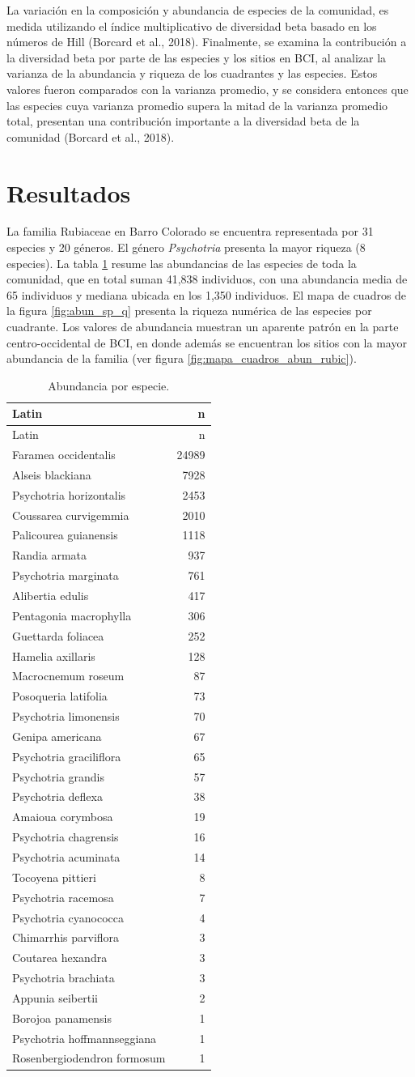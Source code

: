 \documentclass[11pt,]{article}
\begin{document}
La variación en la composición y abundancia de especies de la comunidad,
es medida utilizando el índice multiplicativo de diversidad beta basado
en los números de Hill (Borcard et al., 2018). Finalmente, se examina la
contribución a la diversidad beta por parte de las especies y los sitios
en BCI, al analizar la varianza de la abundancia y riqueza de los
cuadrantes y las especies. Estos valores fueron comparados con la
varianza promedio, y se considera entonces que las especies cuya
varianza promedio supera la mitad de la varianza promedio total,
presentan una contribución importante a la diversidad beta de la
comunidad (Borcard et al., 2018).

\section{Resultados}\label{resultados}

La familia Rubiaceae en Barro Colorado se encuentra representada por 31
especies y 20 géneros. El género \emph{Psychotria} presenta la mayor
riqueza (8 especies). La tabla \ref{tab:abun_sp} resume las abundancias
de las especies de toda la comunidad, que en total suman 41,838
individuos, con una abundancia media de 65 individuos y mediana ubicada
en los 1,350 individuos. El mapa de cuadros de la figura
\ref{fig:abun_sp_q} presenta la riqueza numérica de las especies por
cuadrante. Los valores de abundancia muestran un aparente patrón en la
parte centro-occidental de BCI, en donde además se encuentran los sitios
con la mayor abundancia de la familia (ver figura
\ref{fig:mapa_cuadros_abun_rubic}).

\begin{longtable}[]{@{}lr@{}}
\caption{\label{tab:abun_sp}Abundancia por especie.}\tabularnewline
\toprule
Latin & n\tabularnewline
\midrule
\endfirsthead
\toprule
Latin & n\tabularnewline
\midrule
\endhead
Faramea occidentalis & 24989\tabularnewline
Alseis blackiana & 7928\tabularnewline
Psychotria horizontalis & 2453\tabularnewline
Coussarea curvigemmia & 2010\tabularnewline
Palicourea guianensis & 1118\tabularnewline
Randia armata & 937\tabularnewline
Psychotria marginata & 761\tabularnewline
Alibertia edulis & 417\tabularnewline
Pentagonia macrophylla & 306\tabularnewline
Guettarda foliacea & 252\tabularnewline
Hamelia axillaris & 128\tabularnewline
Macrocnemum roseum & 87\tabularnewline
Posoqueria latifolia & 73\tabularnewline
Psychotria limonensis & 70\tabularnewline
Genipa americana & 67\tabularnewline
Psychotria graciliflora & 65\tabularnewline
Psychotria grandis & 57\tabularnewline
Psychotria deflexa & 38\tabularnewline
Amaioua corymbosa & 19\tabularnewline
Psychotria chagrensis & 16\tabularnewline
Psychotria acuminata & 14\tabularnewline
Tocoyena pittieri & 8\tabularnewline
Psychotria racemosa & 7\tabularnewline
Psychotria cyanococca & 4\tabularnewline
Chimarrhis parviflora & 3\tabularnewline
Coutarea hexandra & 3\tabularnewline
Psychotria brachiata & 3\tabularnewline
Appunia seibertii & 2\tabularnewline
Borojoa panamensis & 1\tabularnewline
Psychotria hoffmannseggiana & 1\tabularnewline
Rosenbergiodendron formosum & 1\tabularnewline
\bottomrule
\end{longtable}
\end{document}
